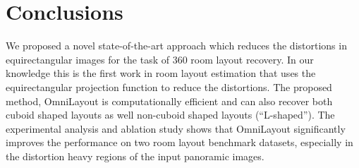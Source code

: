 \documentclass[final]{cvpr}
\begin{document}
\section{Conclusions}\label{sec:con}

We proposed a novel state-of-the-art approach which reduces the distortions in equirectangular images for the task of 360 room layout recovery. In our knowledge this is the first work in room layout estimation that uses the equirectangular projection function to reduce the distortions. The proposed method, OmniLayout is computationally efficient and can also recover both cuboid shaped layouts as well non-cuboid shaped layouts (``L-shaped''). The experimental analysis and ablation study shows that OmniLayout significantly improves the performance on two room layout benchmark datasets, especially in the distortion heavy regions of the input panoramic images. 
{\small


}
\end{document}
